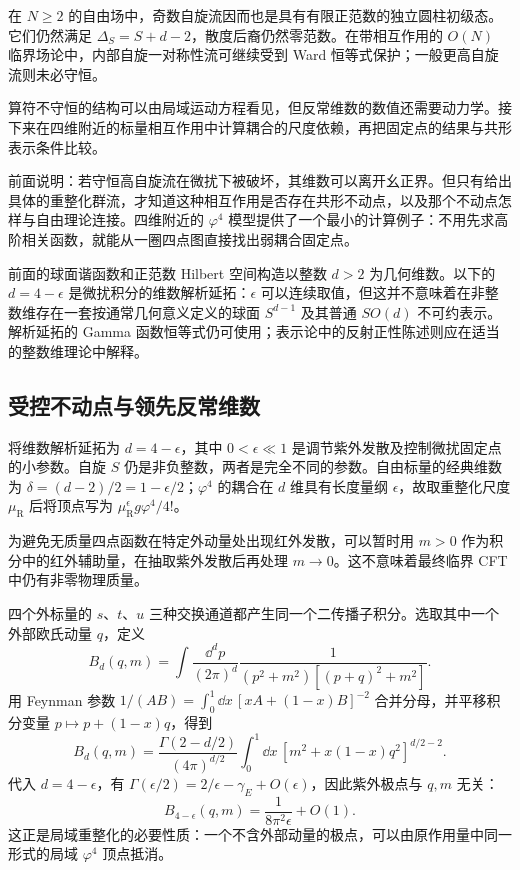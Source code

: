 在 $N\ge2$ 的自由场中，奇数自旋流因而也是具有有限正范数的独立圆柱初级态。它们仍然满足 $\Delta_S=S+d-2$，散度后裔仍然零范数。在带相互作用的 $O(N)$ 临界场论中，内部自旋一对称性流可继续受到 Ward 恒等式保护；一般更高自旋流则未必守恒。




算符不守恒的结构可以由局域运动方程看见，但反常维数的数值还需要动力学。接下来在四维附近的标量相互作用中计算耦合的尺度依赖，再把固定点的结果与共形表示条件比较。




前面说明：若守恒高自旋流在微扰下被破坏，其维数可以离开幺正界。但只有给出具体的重整化群流，才知道这种相互作用是否存在共形不动点，以及那个不动点怎样与自由理论连接。四维附近的 $\varphi^4$ 模型提供了一个最小的计算例子：不用先求高阶相关函数，就能从一圈四点图直接找出弱耦合固定点。


前面的球面谐函数和正范数 Hilbert 空间构造以整数 $d>2$ 为几何维数。以下的 $d=4-\epsilon$ 是微扰积分的维数解析延拓：$\epsilon$ 可以连续取值，但这并不意味着在非整数维存在一套按通常几何意义定义的球面 $S^{d-1}$ 及其普通 $SO(d)$ 不可约表示。解析延拓的 Gamma 函数恒等式仍可使用；表示论中的反射正性陈述则应在适当的整数维理论中解释。


\subsection{受控不动点与领先反常维数}

将维数解析延拓为 $d=4-\epsilon$，其中 $0<\epsilon\ll1$ 是调节紫外发散及控制微扰固定点的小参数。自旋 $S$ 仍是非负整数，两者是完全不同的参数。自由标量的经典维数为 $\delta=(d-2)/2=1-\epsilon/2$；$\varphi^4$ 的耦合在 $d$ 维具有长度量纲 $\epsilon$，故取重整化尺度 $\mu_{\mathrm R}$ 后将顶点写为 $\mu_{\mathrm R}^\epsilon g\varphi^4/4!$。

为避免无质量四点函数在特定外动量处出现红外发散，可以暂时用 $m>0$ 作为积分中的红外辅助量，在抽取紫外发散后再处理 $m\to0$。这不意味着最终临界 CFT 中仍有非零物理质量。


四个外标量的 $s$、$t$、$u$ 三种交换通道都产生同一个二传播子积分。选取其中一个外部欧氏动量 $q$，定义
\begin{equation}\label{eq:ghs-phi4-bubble}
 B_d(q,m)=\int\frac{\dd^dp}{(2\pi)^d}
 \frac1{(p^2+m^2)[(p+q)^2+m^2]}.
\end{equation}
用 Feynman 参数 $1/(AB)=\int_0^1\dd x\,[xA+(1-x)B]^{-2}$ 合并分母，并平移积分变量 $p\mapsto p+(1-x)q$，得到
\begin{equation}\label{eq:ghs-phi4-bubble-feynman-param}
 B_d(q,m)=\frac{\Gamma(2-d/2)}{(4\pi)^{d/2}}
 \int_0^1\dd x\,[m^2+x(1-x)q^2]^{d/2-2}.
\end{equation}
代入 $d=4-\epsilon$，有 $\Gamma(\epsilon/2)=2/\epsilon-\gamma_E+O(\epsilon)$，因此紫外极点与 $q,m$ 无关：
\begin{equation}\label{eq:ghs-phi4-bubble-pole}
 B_{4-\epsilon}(q,m)=\frac1{8\pi^2\epsilon}+O(1).
\end{equation}
这正是局域重整化的必要性质：一个不含外部动量的极点，可以由原作用量中同一形式的局域 $\varphi^4$ 顶点抵消。



